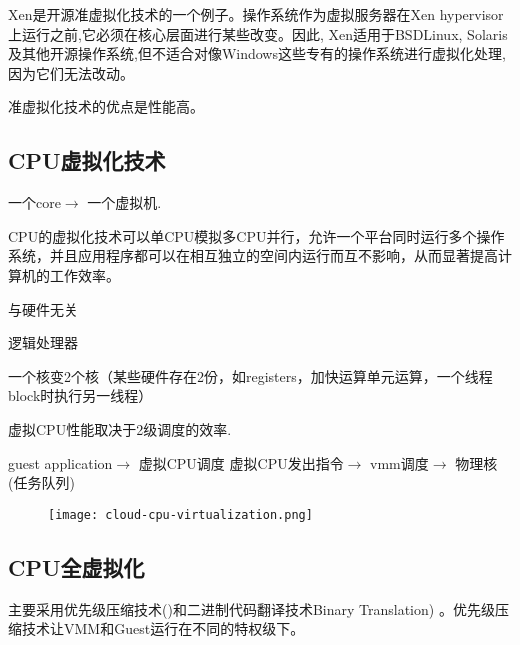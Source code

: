 Xen是开源准虚拟化技术的一个例子。操作系统作为虚拟服务器在Xen hypervisor上运行之前,它必须在核心层面进行某些改变。因此, Xen适用于BSDLinux, Solaris及其他开源操作系统,但不适合对像Windows这些专有的操作系统进行虚拟化处理,因为它们无法改动。

准虚拟化技术的优点是性能高。


\subsection{CPU虚拟化技术}


\begin{definition}[CPU虚拟化技术]
    一个core$\rightarrow$ 一个虚拟机.
\end{definition}

CPU的虚拟化技术可以单CPU模拟多CPU并行，允许一个平台同时运行多个操作系统，并且应用程序都可以在相互独立的空间内运行而互不影响，从而显著提高计算机的工作效率。

\begin{definition}
    与硬件无关
\end{definition}

\begin{definition}
    逻辑处理器
\end{definition}

\begin{definition}[hyperthread]
    一个核变2个核（某些硬件存在2份，如registers，加快运算单元运算，一个线程block时执行另一线程）
\end{definition}

\begin{remark}
    虚拟CPU性能取决于2级调度的效率.

    guest application$\rightarrow$ 虚拟CPU调度
    虚拟CPU发出指令$\rightarrow$ vmm调度$\rightarrow$ 物理核(任务队列)

    \begin{figure}[htbp]
        \begin{center}
            \texttt{[image: cloud-cpu-virtualization.png]}
        \end{center}
    \end{figure}
\end{remark}



\subsection{CPU全虚拟化}
主要采用优先级压缩技术()和二进制代码翻译技术Binary Translation) 。优先级压缩技术让VMM和Guest运行在不同的特权级下。

